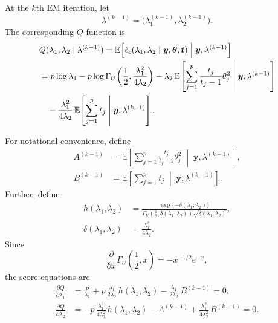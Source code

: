 \documentclass[preprint,12pt,authoryear]{elsarticle}
\def\bs{\boldsymbol}
\def\th{\boldsymbol{\theta}}
\begin{document}
At the \(k\)th EM iteration, let
\[
\lambda^{(k-1)}
=
\bigl(\lambda_1^{(k-1)},\lambda_2^{(k-1)}\bigr).
\]
The corresponding \(Q\)-function is
\begin{align}
&Q(\lambda_1,\lambda_2\mid \lambda^{(k-1)})
=
\mathbb E\!\left[
\ell_c(\lambda_1,\lambda_2 \mid \bs y,\th,\bs t)
\;\middle|\;
\bs y,\lambda^{(k-1)}
\right]
\notag\\
&=
p\log \lambda_1
-
p\log \Gamma_U\!\left(
\frac12,\frac{\lambda_1^2}{4\lambda_2}
\right)
-\lambda_2\,
\mathbb E\!\left[
\sum_{j=1}^p \frac{t_j}{t_j-1}\theta_j^2
\;\middle|\;
\bs y,\lambda^{(k-1)}
\right]
\notag\\
&\quad
-\frac{\lambda_1^2}{4\lambda_2}\,
\mathbb E\!\left[
\sum_{j=1}^p t_j
\;\middle|\;
\bs y,\lambda^{(k-1)}
\right].
\label{eq:Q_function_lambda_clean}
\end{align}


For notational convenience, define
\begin{align}
A^{(k-1)}
&=
\mathbb E\!\left[
\sum_{j=1}^p \frac{t_j}{t_j-1}\theta_j^2
\;\middle|\;
\bs y,\lambda^{(k-1)}
\right],
\label{eq:A_kminus1}
\\
B^{(k-1)}
&=
\mathbb E\!\left[
\sum_{j=1}^p t_j
\;\middle|\;
\bs y,\lambda^{(k-1)}
\right].
\label{eq:B_kminus1}
\end{align}
Further, define
\begin{align}
h(\lambda_1,\lambda_2)
&=
\frac{\exp\{-\delta(\lambda_1,\lambda_2)\}}
{\Gamma_U\!\left(\frac12,\delta(\lambda_1,\lambda_2)\right)
\sqrt{\delta(\lambda_1,\lambda_2)}},
\label{eq:h_definition}
\\
\delta(\lambda_1,\lambda_2)
&=
\frac{\lambda_1^2}{4\lambda_2}.
\end{align}
Since
\[
\frac{\partial}{\partial x}\Gamma_U\!\left(\frac12,x\right)
=
-x^{-1/2}e^{-x},
\]
the score equations are
\begin{align}
\frac{\partial Q}{\partial \lambda_1}
&=
\frac{p}{\lambda_1}
+
p\,\frac{\lambda_1}{2\lambda_2}\,
h(\lambda_1,\lambda_2)
-
\frac{\lambda_1}{2\lambda_2}\,B^{(k-1)}=0,
\label{eq:score_lambda1_clean}
\\[1mm]
\frac{\partial Q}{\partial \lambda_2}
&=
-
p\,\frac{\lambda_1^2}{4\lambda_2^2}\,
h(\lambda_1,\lambda_2)
-
A^{(k-1)}
+
\frac{\lambda_1^2}{4\lambda_2^2}\,B^{(k-1)}=0.
\label{eq:score_lambda2_clean}
\end{align}
\end{document}
